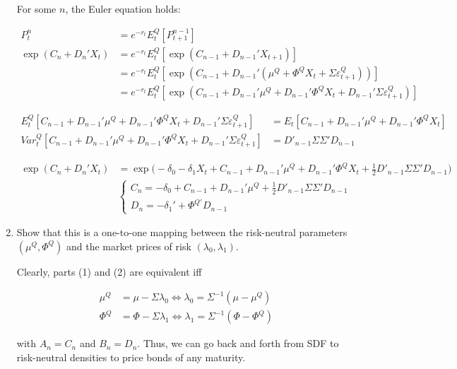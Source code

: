 \documentclass{article}
\begin{document}
\begin{enumerate}
For some $n$, the Euler equation holds:

\begin{align*}
P_t^n 
&= e^{-r_t} E_t^Q [P_{t+1}^{n-1}]\\
\exp(C_n + D_n'X_t)
&= e^{-r_t} E_t^Q [\exp(C_{n-1} + D_{n-1}'X_{t+1})]\\
&= e^{-r_t} E_t^Q [\exp(C_{n-1} + D_{n-1}'(\mu^Q + \Phi^Q X_t + \Sigma \varepsilon_{t+1}^Q))]\\
&= e^{-r_t} E_t^Q [\exp(C_{n-1} + D_{n-1}'\mu^Q + D_{n-1}'\Phi^Q X_t + D_{n-1}'\Sigma \varepsilon_{t+1}^Q)]
\end{align*}

\begin{align*}
E_t^Q[C_{n-1} + D_{n-1}'\mu^Q + D_{n-1}'\Phi^Q X_t + D_{n-1}'\Sigma \varepsilon_{t+1}^Q] 
&= E_t[C_{n-1} + D_{n-1}'\mu^Q + D_{n-1}'\Phi^Q X_t]\\
Var_t^Q [C_{n-1} + D_{n-1}'\mu^Q + D_{n-1}'\Phi^Q X_t + D_{n-1}'\Sigma \varepsilon_{t+1}^Q]
&= D'_{n-1} \Sigma \Sigma' D_{n-1}
\end{align*}

\begin{align*}
\exp(C_n + D_n'X_t)
&=  \exp \Bigg(-\delta_0 - \delta_1 X_t + C_{n-1} + D_{n-1}'\mu^Q + D_{n-1}'\Phi^Q X_t + \frac{1}{2} D'_{n-1} \Sigma \Sigma' D_{n-1} \Bigg)\\
& \begin{cases}
C_n = -\delta_0  + C_{n-1} + D_{n-1}'\mu^Q  + \frac{1}{2} D'_{n-1} \Sigma \Sigma' D_{n-1}\\
D_n = - \delta_1' + \Phi^{Q'} D_{n-1}
\end{cases}
\end{align*}

\item Show that this is a one-to-one mapping between the risk-neutral parameters $(\mu^Q,  \Phi^Q)$ and the market prices of risk $(\lambda_0, \lambda_1)$.

\bigskip

Clearly, parts (1) and (2) are equivalent iff

\begin{align*}
\mu^Q &= \mu - \Sigma \lambda_0  \iff \lambda_0 = \Sigma^{-1}(\mu - \mu^Q)\\
\Phi^Q &= \Phi - \Sigma \lambda_1 \iff \lambda_1 = \Sigma^{-1}(\Phi - \Phi^Q)
\end{align*}

with $A_n = C_n$ and $B_n = D_n$. Thus, we can go back and forth from SDF to risk-neutral densities to price bonds of any maturity.

\end{enumerate}
\end{document}
